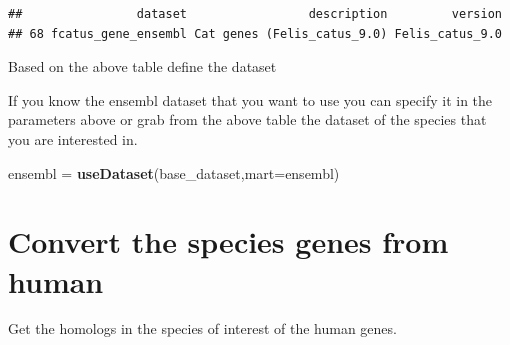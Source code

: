 \documentclass[
]{book}
\newenvironment{Shaded}{\begin{snugshade}}{\end{snugshade}}
\newcommand{\AttributeTok}[1]{\textcolor[rgb]{0.13,0.29,0.53}{#1}}
\newcommand{\CommentTok}[1]{\textcolor[rgb]{0.56,0.35,0.01}{\textit{#1}}}
\newcommand{\ConstantTok}[1]{\textcolor[rgb]{0.56,0.35,0.01}{#1}}
\newcommand{\FunctionTok}[1]{\textcolor[rgb]{0.13,0.29,0.53}{\textbf{#1}}}
\newcommand{\NormalTok}[1]{#1}
\newcommand{\OtherTok}[1]{\textcolor[rgb]{0.56,0.35,0.01}{#1}}
\newcommand{\SpecialCharTok}[1]{\textcolor[rgb]{0.81,0.36,0.00}{\textbf{#1}}}
\newcommand{\StringTok}[1]{\textcolor[rgb]{0.31,0.60,0.02}{#1}}
\begin{document}
\begin{verbatim}
##                dataset                 description         version
## 68 fcatus_gene_ensembl Cat genes (Felis_catus_9.0) Felis_catus_9.0
\end{verbatim}

Based on the above table define the dataset

\begin{Shaded}
\end{Shaded}

If you know the ensembl dataset that you want to use you can specify it in the parameters above or grab from the above table the dataset of the species that you are interested in.

\begin{Shaded}
\begin{Highlighting}[]
\NormalTok{ensembl }\OtherTok{=} \FunctionTok{useDataset}\NormalTok{(base\_dataset,}\AttributeTok{mart=}\NormalTok{ensembl)}
\end{Highlighting}
\end{Shaded}

\section{Convert the species genes from human}\label{convert-the-species-genes-from-human}

Get the homologs in the species of interest of the human genes.
\end{document}
